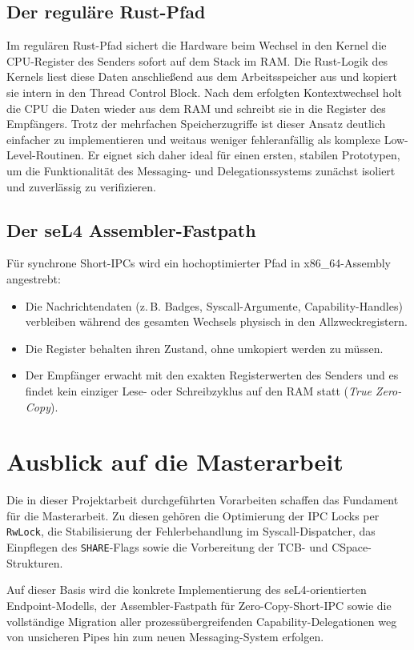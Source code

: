 \subsection*{Der reguläre Rust-Pfad}
Im regulären Rust-Pfad sichert die Hardware beim Wechsel in den Kernel die CPU-Register des Senders sofort auf dem Stack im RAM. Die Rust-Logik des Kernels liest diese Daten anschließend aus dem Arbeitsspeicher aus und kopiert sie intern in den Thread Control Block. Nach dem erfolgten Kontextwechsel holt die CPU die Daten wieder aus dem RAM und schreibt sie in die Register des Empfängers. Trotz der mehrfachen Speicherzugriffe ist dieser Ansatz deutlich einfacher zu implementieren und weitaus weniger fehleranfällig als komplexe Low-Level-Routinen. Er eignet sich daher ideal für einen ersten, stabilen Prototypen, um die Funktionalität des Messaging- und Delegationssystems zunächst isoliert und zuverlässig zu verifizieren.

\subsection*{Der seL4 Assembler-Fastpath}
Für synchrone Short-IPCs wird ein hochoptimierter Pfad in x86\_64-Assembly angestrebt:
\begin{itemize}
    \item Die Nachrichtendaten (z.\,B. Badges, Syscall-Argumente, Capability-Handles) verbleiben während des gesamten Wechsels physisch in den Allzweckregistern.
    \item Die Register behalten ihren Zustand, ohne umkopiert werden zu müssen.
    \item Der Empfänger erwacht mit den exakten Registerwerten des Senders und es findet kein einziger Lese- oder Schreibzyklus auf den RAM statt (\textit{True Zero-Copy}).
\end{itemize}


\section{Ausblick auf die Masterarbeit}

Die in dieser Projektarbeit durchgeführten Vorarbeiten schaffen das Fundament für die Masterarbeit. Zu diesen gehören die Optimierung der IPC Locks per \texttt{RwLock}, die Stabilisierung der Fehlerbehandlung im Syscall-Dispatcher, das Einpflegen des \texttt{SHARE}-Flags sowie die Vorbereitung der TCB- und CSpace-Strukturen.

Auf dieser Basis wird die konkrete Implementierung des seL4-orientierten Endpoint-Modells, der Assembler-Fastpath für Zero-Copy-Short-IPC sowie die vollständige Migration aller prozessübergreifenden Capability-Delegationen weg von unsicheren Pipes hin zum neuen Messaging-System erfolgen.
